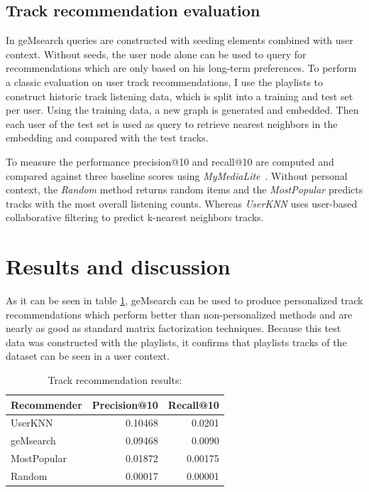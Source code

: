 \documentclass[sigconf]{acmart}
\begin{document}
\subsection{Track recommendation evaluation}
\label{subsec:track_rec_eval}
In geMsearch queries are constructed with seeding elements combined with user context. Without seeds, the user node alone can be used to query for recommendations which are only based on his long-term preferences. To perform a classic evaluation on user track recommendations, I use the playlists to construct historic track listening data, which is split into a training and test set per user. Using the training data, a new graph is generated and embedded. Then each user of the test set is used as query to retrieve nearest neighbors in the embedding and compared with the test tracks. 

To measure the performance precision@10 and recall@10 are computed and compared against three baseline scores using \emph{MyMediaLite}~\cite{Gantner2011MyMediaLite}. Without personal context, the \emph{Random} method returns random items and the \emph{MostPopular} predicts tracks with the most overall listening counts. Whereas \emph{UserKNN} uses user-based collaborative filtering to predict k-nearest neighbors tracks. 


\section{Results and discussion}
\label{sec:discussion}
As it can be seen in table \ref{table:track_rec_results}, geMsearch can be used to produce personalized track recommendations which perform better than non-personalized methods and are nearly as good as standard matrix factorization techniques. Because this test data was constructed with the playlists, it confirms that playlists tracks of the dataset can be seen in a user context.

\begin{table}[H]
	\caption{Track recommendation results:}
	\label{table:track_rec_results}
	\begin{tabular}{lrr}
		\midrule 
		\textbf{Recommender} & \textbf{Precision@10} & \textbf{Recall@10} \\ 
		\midrule 
		UserKNN   & 0.10468 & 0.0201  \\
		geMsearch   &  0.09468 &  0.0090  \\ %
		MostPopular   & 0.01872 & 0.00175  \\
		Random   & 0.00017 & 0.00001  \\
		\bottomrule
	\end{tabular}
\end{table}
\end{document}
